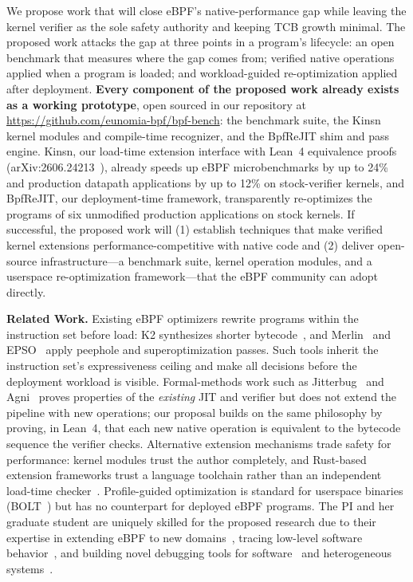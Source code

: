 We propose work that will close eBPF's native-performance gap while leaving the kernel verifier as the sole safety authority and keeping TCB growth minimal.  The proposed work attacks the gap at three points in a program's lifecycle: an open benchmark that measures where the gap comes from; verified native operations applied when a program is loaded; and workload-guided re-optimization applied after deployment.  \textbf{Every component of the proposed work already exists as a working prototype}, open sourced in our repository at \url{https://github.com/eunomia-bpf/bpf-bench}: the benchmark suite, the Kinsn kernel modules and compile-time recognizer, and the BpfReJIT shim and pass engine.  Kinsn, our load-time extension interface with Lean~4 equivalence proofs (arXiv:2606.24213~\cite{zheng2026kinsn}), already speeds up eBPF microbenchmarks by up to 24\% and production datapath applications by up to 12\% on stock-verifier kernels, and BpfReJIT, our deployment-time framework, transparently re-optimizes the programs of six unmodified production applications on stock kernels.  If successful, the proposed work will (1) establish techniques that make verified kernel extensions performance-competitive with native code and (2) deliver open-source infrastructure---a benchmark suite, kernel operation modules, and a userspace re-optimization framework---that the eBPF community can adopt directly.

\noindent \textbf{Related Work.}
Existing eBPF optimizers rewrite programs within the instruction set before load: K2 synthesizes shorter bytecode~\cite{xu2021synthesizing}, and Merlin~\cite{mao2024merlin} and EPSO~\cite{zhu2025epso} apply peephole and superoptimization passes.  Such tools inherit the instruction set's expressiveness ceiling and make all decisions before the deployment workload is visible.  Formal-methods work such as Jitterbug~\cite{nelson2020specification} and Agni~\cite{vishwanathan2023verifying} proves properties of the \textit{existing} JIT and verifier but does not extend the pipeline with new operations; our proposal builds on the same philosophy by proving, in Lean~4, that each new native operation is equivalent to the bytecode sequence the verifier checks.  Alternative extension mechanisms trade safety for performance: kernel modules trust the author completely, and Rust-based extension frameworks trust a language toolchain rather than an independent load-time checker~\cite{jia2025rex}.  Profile-guided optimization is standard for userspace binaries (\eg BOLT~\cite{panchenko2019bolt}) but has no counterpart for deployed eBPF programs.  The PI and her graduate student are uniquely skilled for the proposed research due to their expertise in extending eBPF to new domains~\cite{zheng2025extending,yang2025egpu}, tracing low-level software behavior~\cite{Quinn_2018_sledgehammer}, and building novel debugging tools for software~\cite{Quinn_2022_omnitable} and heterogeneous systems~\cite{Ma_2022_bnw}.

